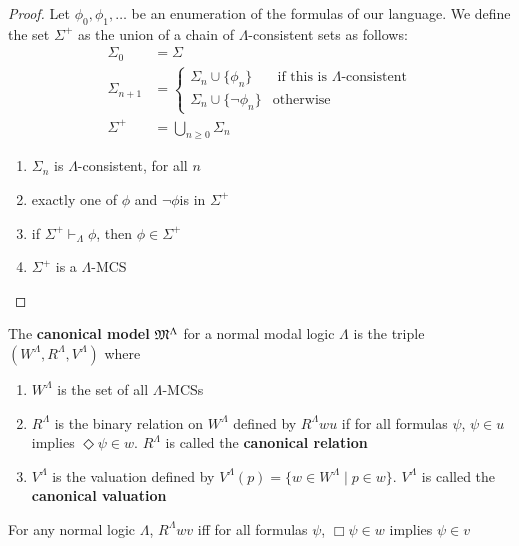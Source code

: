 \documentclass[11pt]{article}
\begin{document}
\begin{proof}
Let \(\phi_0,\phi_1,\dots\) be an enumeration of the formulas of our
language. We define the set \(\Sigma^+\) as the union of a chain of
\(\Lambda\)-consistent sets as follows:
\begin{align*}
\Sigma_0&=\Sigma\\
\Sigma_{n+1}&=
\begin{cases}
\Sigma_n\cup\{\phi_n\} &\text{ if this is $\Lambda$-consistent}\\
\Sigma_n\cup\{\neg\phi_n\}&\text{otherwise}
\end{cases}\\
\Sigma^+&=\bigcup_{n\ge0}\Sigma_n
\end{align*}
\begin{enumerate}
\item \(\Sigma_n\) is \(\Lambda\)-consistent, for all \(n\)
\item exactly one of \(\phi\) and \(\neg\phi\)is in \(\Sigma^+\)
\item if \(\Sigma^+\vdash_{\Lambda}\phi\), then \(\phi\in\Sigma^{+}\)
\item \(\Sigma^{+}\) is a \(\Lambda\)-MCS
\end{enumerate}
\end{proof}

\begin{definition}[]
The \textbf{canonical model} \(\mathfrak{M}^{\Lambda}\) for a normal modal logic \(\Lambda\) is the triple
\((W^\Lambda,R^\Lambda,V^\Lambda)\) where
\begin{enumerate}
\item \(W^\Lambda\) is the set of all \(\Lambda\)-MCSs
\item \(R^\Lambda\) is the binary relation on \(W^\Lambda\) defined by
\(R^\Lambda wu\) if for all formulas \(\psi\), \(\psi\in u\) implies \(\Diamond\psi\in
      w\). \(R^\Lambda\) is called the \textbf{canonical relation}
\item \(V^\Lambda\) is the valuation defined by \(V^\Lambda(p)=\{w\in W^\Lambda\mid
      p\in w\}\). \(V^\Lambda\) is called the \textbf{canonical valuation}
\end{enumerate}
\end{definition}

\begin{lemma}[]
\label{lemma4.19}
For any normal logic \(\Lambda\), \(R^\Lambda wv\) iff for all formulas \(\psi\), \(\Box\psi\in w\)
implies \(\psi\in v\)
\end{lemma}
\end{document}
